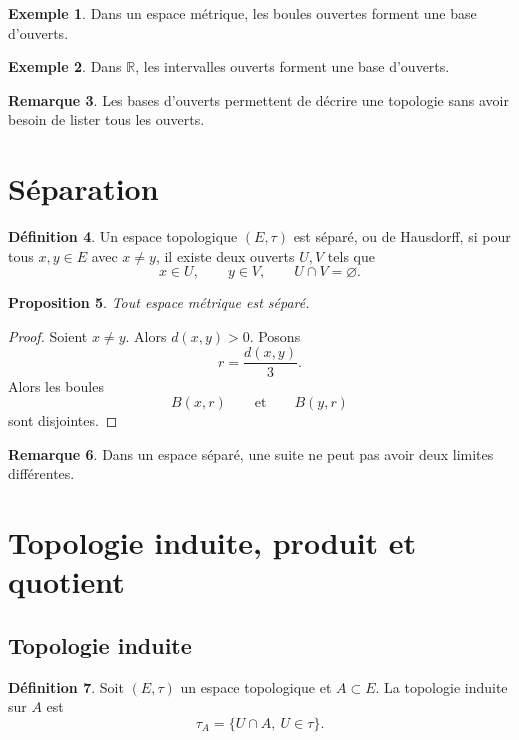 \documentclass[11pt,a4paper]{article}
\theoremstyle{definition}
\newtheorem{definition}{Définition}[section]
\newtheorem{exemple}[definition]{Exemple}
\newtheorem{remarque}[definition]{Remarque}
\theoremstyle{plain}
\newtheorem{proposition}[definition]{Proposition}
\newcommand{\R}{\mathbb{R}}
\begin{document}
\begin{exemple}
Dans un espace métrique, les boules ouvertes forment une base d'ouverts.
\end{exemple}

\begin{exemple}
Dans $\R$, les intervalles ouverts forment une base d'ouverts.
\end{exemple}

\begin{remarque}
Les bases d'ouverts permettent de décrire une topologie sans avoir besoin de lister tous les ouverts.
\end{remarque}

\section{Séparation}

\begin{definition}
Un espace topologique $(E,\tau)$ est séparé, ou de Hausdorff, si pour tous $x,y\in E$ avec $x\neq y$, il existe deux ouverts $U,V$ tels que
\[
x\in U,\qquad y\in V,
\qquad U\cap V=\varnothing.
\]
\end{definition}

\begin{proposition}
Tout espace métrique est séparé.
\end{proposition}

\begin{proof}
Soient $x\neq y$.
Alors $d(x,y)>0$.
Posons
\[
r=\frac{d(x,y)}{3}.
\]
Alors les boules
\[
B(x,r)
\qquad\text{et}\qquad
B(y,r)
\]
sont disjointes.
\end{proof}

\begin{remarque}
Dans un espace séparé, une suite ne peut pas avoir deux limites différentes.
\end{remarque}

\section{Topologie induite, produit et quotient}

\subsection{Topologie induite}

\begin{definition}
Soit $(E,\tau)$ un espace topologique et $A\subset E$.
La topologie induite sur $A$ est
\[
\tau_A=\{U\cap A,\ U\in\tau\}.
\]
\end{definition}
\end{document}
